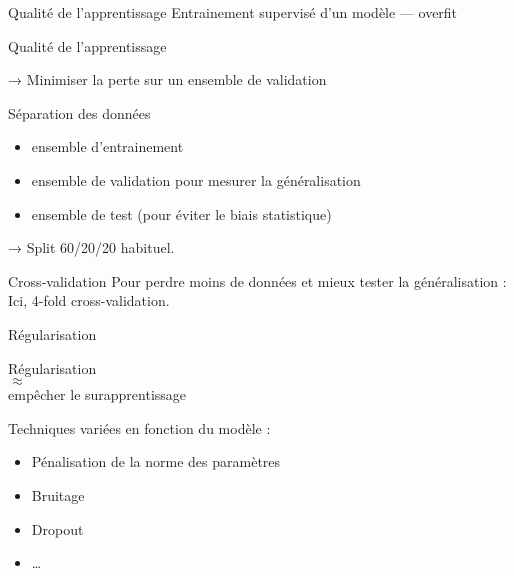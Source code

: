 \begin{frame}{Qualité de l'apprentissage}
  Entrainement supervisé d'un modèle — overfit


\end{frame}

\begin{frame}{Qualité de l'apprentissage}


  → Minimiser la perte sur un ensemble de validation
\end{frame}

\begin{frame}{Séparation des données}
  \begin{itemize}
  \item ensemble d'entrainement
  \item ensemble de validation pour mesurer la généralisation
  \item ensemble de test (pour éviter le biais statistique)
  \end{itemize}
  → Split 60/20/20 habituel.
\end{frame}

\begin{frame}{Cross-validation}
  Pour \og perdre\fg{} moins de données et mieux tester la
  généralisation :
  Ici, 4-fold cross-validation.
\end{frame}

\begin{frame}{Régularisation}
  \begin{minipage}[l]{0.49\linewidth}
    \begin{center}
      Régularisation \\
      $\approx$\\
      empêcher le surapprentissage
    \end{center}
  \end{minipage}\hfill
  \begin{minipage}[l]{0.49\linewidth}
  \end{minipage}\hfill
  Techniques variées en fonction du modèle :
  \begin{itemize}
  \item Pénalisation de la norme des paramètres
  \item Bruitage
  \item Dropout
  \item …
  \end{itemize}
\end{frame}

